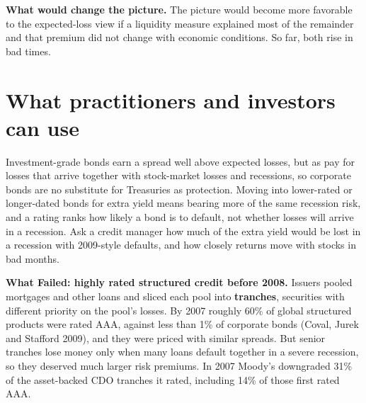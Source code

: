 \textbf{What would change the picture.} The picture would become more favorable to the expected-loss view if a liquidity measure explained most of the remainder and that premium did not change with economic conditions. So far, both rise in bad times.

\section{What practitioners and investors can use}
\label{sec:15-investors}

Investment-grade bonds earn a spread well above expected losses, but as pay for losses that arrive together with stock-market losses and recessions, so corporate bonds are no substitute for Treasuries as protection. Moving into lower-rated or longer-dated bonds for extra yield means bearing more of the same recession risk, and a rating ranks how likely a bond is to default, not whether losses will arrive in a recession. Ask a credit manager how much of the extra yield would be lost in a recession with 2009-style defaults, and how closely returns move with stocks in bad months.

\begin{callout}
\textbf{What Failed: highly rated structured credit before 2008.} Issuers pooled mortgages and other loans and sliced each pool into \textbf{tranches}, securities with different priority on the pool's losses. By 2007 roughly 60\% of global structured products were rated AAA, against less than 1\% of corporate bonds (Coval, Jurek and Stafford 2009), and they were priced with similar spreads. But senior tranches lose money only when many loans default together in a severe recession, so they deserved much larger risk premiums. In 2007 Moody's downgraded 31\% of the asset-backed CDO tranches it rated, including 14\% of those first rated AAA.
\end{callout}

\makeatletter
{}
\makeatother

